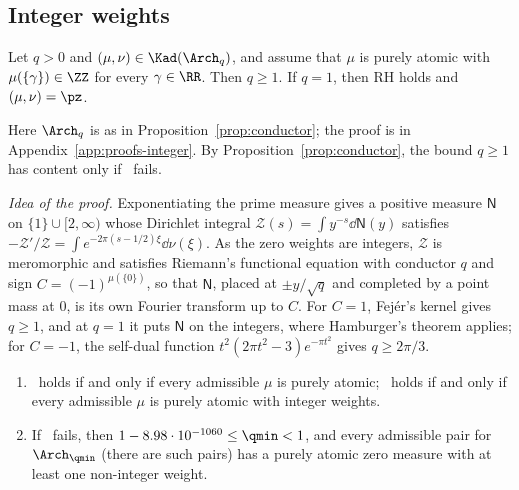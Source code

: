 \subsection{Integer weights}\label{ssec:integer}

\begin{theorem}\label{thm:integer}
Let $q>0$ and $(\mu,\nu)\in\Kad(\Arch_q)$, and assume that $\mu$ is purely atomic with $\mu(\{\gamma\})\in\ZZ$ for every $\gamma\in\RR$. Then
$q\ge1$. If $q=1$, then RH holds and $(\mu,\nu)=\pz$.
\end{theorem}

Here $\Arch_q$ is as in Proposition~\ref{prop:conductor}; the proof is in Appendix~\ref{app:proofs-integer}. By
Proposition~\ref{prop:conductor}, the bound $q\ge1$ has content only if \condS\ fails.

\emph{Idea of the proof.} Exponentiating the prime measure gives a positive measure $\mathsf N$ on $\{1\}\cup[2,\infty)$ whose Dirichlet
integral $\mathcal Z(s)=\int y^{-s}\dd\mathsf N(y)$ satisfies $-\mathcal Z'/\mathcal Z=\int e^{-2\pi(s-1/2)\xi}\dd\nu(\xi)$. As the zero weights are
integers, $\mathcal Z$ is meromorphic and satisfies Riemann's functional equation with conductor $q$ and sign $C=(-1)^{\mu(\{0\})}$, so that
$\mathsf N$, placed at $\pm y/\sqrt q$ and completed by a point mass at $0$, is its own Fourier transform up to $C$. For $C=1$, Fej\'er's kernel
gives $q\ge1$, and at $q=1$ it puts $\mathsf N$ on the integers, where Hamburger's theorem applies; for $C=-1$, the self-dual function
$t^2(2\pi t^2-3)e^{-\pi t^2}$ gives $q\ge2\pi/3$.

\begin{corollary}\label{cor:integer}
\begin{enumerate}[label=\textup{(\alph*)}]
\item \condS\ holds if and only if every admissible $\mu$ is purely atomic; \condU\ holds if and only if every admissible $\mu$ is purely
atomic with integer weights.
\item If \condS\ fails, then $1-8.98\cdot10^{-1060}\le\qmin<1$, and every admissible pair for $\Arch_{\qmin}$ \textup{(}there are such
pairs\textup{)} has a purely atomic zero measure with at least one non-integer weight.
\end{enumerate}
\end{corollary}

